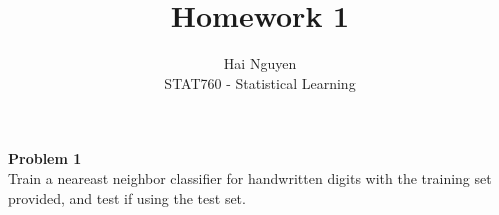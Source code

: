 \documentclass[12pt]{article}
\begin{document}
 
 
 
\title{Homework 1}%
\author{Hai Nguyen\\ %
STAT760 - Statistical Learning} %
 
\maketitle
 
\textbf{Problem 1}
\\Train a neareast neighbor classifier for handwritten digits with the training set provided, and test if using the test set.
\end{document}
